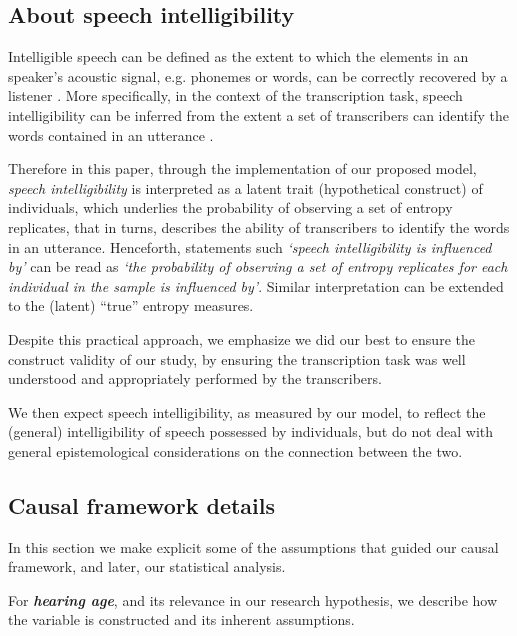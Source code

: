 \subsection{About speech intelligibility} \label{sSA:SI}
%
Intelligible speech can be defined as the extent to which the elements in an speaker's acoustic signal, e.g. phonemes or words, can be correctly recovered by a listener \citep{Kent_et_al_1989, Whitehill_et_al_2004, vanHeuven_2008, Freeman_et_al_2017}. More specifically, in the context of the transcription task, speech intelligibility can be inferred from the extent a set of transcribers can identify the words contained in an utterance \cite{Boonen_et_al_2021}.

Therefore in this paper, through the implementation of our proposed model, \textit{speech intelligibility} is interpreted as a latent trait (hypothetical construct) of individuals, which underlies the probability of observing a set of entropy replicates, that in turns, describes the ability of transcribers to identify the words in an utterance. Henceforth, statements such \textit{`speech intelligibility is influenced by'} can be read as \textit{`the probability of observing a set of entropy replicates for each individual in the sample is influenced by'}. Similar interpretation can be extended to the (latent) ``true'' entropy measures.

Despite this practical approach, we emphasize we did our best to ensure the construct validity of our study, by ensuring the transcription task was well understood and appropriately performed by the transcribers.

We then expect speech intelligibility, as measured by our model, to reflect the (general) intelligibility of speech possessed by individuals, but do not deal with general epistemological considerations on the connection between the two.
%
%
\subsection{Causal framework details} \label{sSA:causal_details}
%
In this section we make explicit some of the assumptions that guided our causal framework, and later, our statistical analysis.

For \textbf{\textit{hearing age}}, and its relevance in our research hypothesis, we describe how the variable is constructed and its inherent assumptions. 

